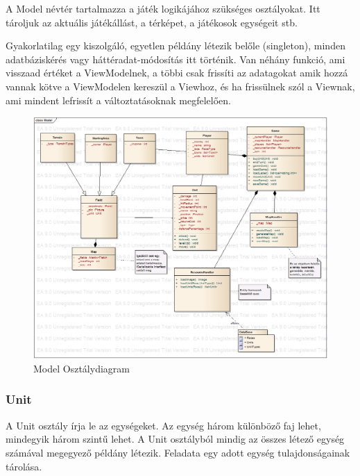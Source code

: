 \documentclass[a4paper,12pt]{report}
\begin{document}
A Model névtér tartalmazza a játék logikájához szükséges osztályokat. Itt tároljuk az aktuális játékállást, a térképet, a játékosok egységeit stb.

Gyakorlatilag egy kiszolgáló, egyetlen példány létezik belőle (singleton), minden adatbáziskérés vagy háttéradat-módosítás itt történik. Van néhány funkció, ami visszaad értéket a ViewModelnek, a többi csak frissíti az adatagokat amik hozzá vannak kötve a ViewModelen kereszül a Viewhoz, és ha frissülnek szól a Viewnak, ami mindent lefrissít a változtatásoknak megfelelően.

\begin{figure}[hbtp]
\centering
\includegraphics[width=1\textwidth]{ModelClass.png}
\caption{Model Osztálydiagram}
\label{fig:mc}
\end{figure}

\subsubsection{Unit}
A Unit osztály írja le az egységeket. Az egység három különböző faj lehet, mindegyik három szintű lehet. A Unit osztályból mindig az összes létező egység számával megegyező példány létezik. Feladata egy adott egység tulajdonságainak tárolása.
\end{document}
